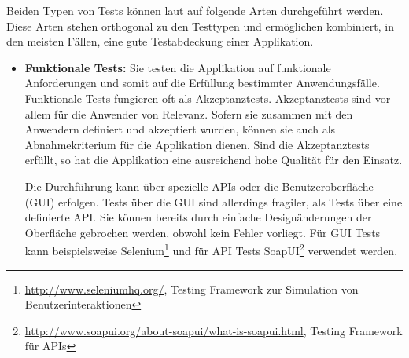 Beiden Typen von Tests können laut \cite{wolff2014} auf folgende Arten durchgeführt werden. Diese Arten stehen orthogonal zu den Testtypen und ermöglichen kombiniert, in den meisten Fällen, eine gute Testabdeckung einer Applikation.
	
\begin{itemize}
	\item \textbf{Funktionale Tests:} Sie testen die Applikation auf funktionale Anforderungen und somit auf die Erfüllung bestimmter Anwendungsfälle. Funktionale Tests fungieren oft als Akzeptanztests. Akzeptanztests sind vor allem für die Anwender von Relevanz. Sofern sie zusammen mit den Anwendern definiert und akzeptiert wurden, können sie auch als Abnahmekriterium für die Applikation dienen. Sind die Akzeptanztests erfüllt, so hat die Applikation eine ausreichend hohe Qualität für den Einsatz.
	
Die Durchführung kann über spezielle APIs oder die Benutzeroberfläche (GUI) erfolgen. Tests über die GUI sind allerdings fragiler, als Tests über eine definierte API. Sie können bereits durch einfache Designänderungen der Oberfläche gebrochen werden, obwohl kein Fehler vorliegt. Für GUI Tests kann beispielsweise Selenium\footnote{\url{http://www.seleniumhq.org/}, Testing Framework zur Simulation von Benutzerinteraktionen} und für API Tests SoapUI\footnote{\url{http://www.soapui.org/about-soapui/what-is-soapui.html}, Testing Framework für APIs} verwendet werden.
	

\end{itemize}
